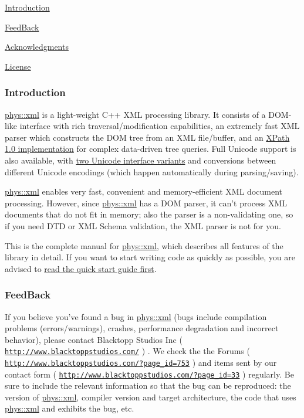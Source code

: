 \begin{DoxyItemize}
\item \hyperlink{XMLManual_XMLIntroduction}{Introduction}
\item \hyperlink{XMLManual_XMLFeedBack}{FeedBack}
\item \hyperlink{XMLManual_XMLAcknowledgments}{Acknowledgments}
\item \hyperlink{XMLManual_XMLLicense}{License}
\end{DoxyItemize}\hypertarget{XMLManual_XMLIntroduction}{}\subsubsection{Introduction}\label{XMLManual_XMLIntroduction}
\hyperlink{namespacephys_1_1xml}{phys::xml} is a light-\/weight C++ XML processing library. It consists of a DOM-\/like interface with rich traversal/modification capabilities, an extremely fast XML parser which constructs the DOM tree from an XML file/buffer, and an \hyperlink{classphys_1_1xml_1_1XPathQuery}{XPath 1.0 implementation} for complex data-\/driven tree queries. Full Unicode support is also available, with \hyperlink{XMLManual_XMLUnicode}{two Unicode interface variants} and conversions between different Unicode encodings (which happen automatically during parsing/saving). \par
 \par
 \hyperlink{namespacephys_1_1xml}{phys::xml} enables very fast, convenient and memory-\/efficient XML document processing. However, since \hyperlink{namespacephys_1_1xml}{phys::xml} has a DOM parser, it can't process XML documents that do not fit in memory; also the parser is a non-\/validating one, so if you need DTD or XML Schema validation, the XML parser is not for you. \par
 \par
 This is the complete manual for \hyperlink{namespacephys_1_1xml}{phys::xml}, which describes all features of the library in detail. If you want to start writing code as quickly as possible, you are advised to \hyperlink{XMLQuickStart}{read the quick start guide first}. \hypertarget{XMLManual_XMLFeedBack}{}\subsubsection{FeedBack}\label{XMLManual_XMLFeedBack}
If you believe you've found a bug in \hyperlink{namespacephys_1_1xml}{phys::xml} (bugs include compilation problems (errors/warnings), crashes, performance degradation and incorrect behavior), please contact Blacktopp Studios Inc ( \href{http://www.blacktoppstudios.com/}{\tt http://www.blacktoppstudios.com/} ) . We check the the Forums ( \href{http://www.blacktoppstudios.com/?page_id=753}{\tt http://www.blacktoppstudios.com/?page\_\-id=753} ) and items sent by our contact form ( \href{http://www.blacktoppstudios.com/?page_id=33}{\tt http://www.blacktoppstudios.com/?page\_\-id=33} ) regularly. Be sure to include the relevant information so that the bug can be reproduced: the version of \hyperlink{namespacephys_1_1xml}{phys::xml}, compiler version and target architecture, the code that uses \hyperlink{namespacephys_1_1xml}{phys::xml} and exhibits the bug, etc. \par
